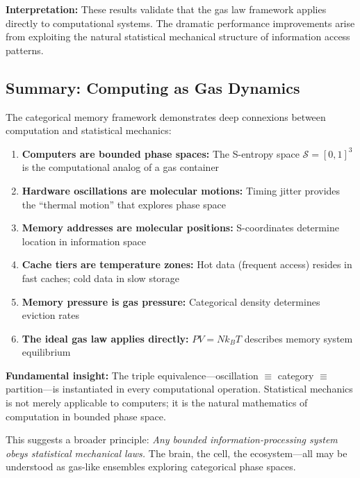 \textbf{Interpretation:} These results validate that the gas law framework applies directly to computational systems. The dramatic performance improvements arise from exploiting the natural statistical mechanical structure of information access patterns.

\subsection{Summary: Computing as Gas Dynamics}

The categorical memory framework demonstrates deep connexions between computation and statistical mechanics:

\begin{enumerate}
\item \textbf{Computers are bounded phase spaces:} The S-entropy space $\mathcal{S} = [0,1]^3$ is the computational analog of a gas container

\item \textbf{Hardware oscillations are molecular motions:} Timing jitter provides the ``thermal motion'' that explores phase space

\item \textbf{Memory addresses are molecular positions:} S-coordinates determine location in information space

\item \textbf{Cache tiers are temperature zones:} Hot data (frequent access) resides in fast caches; cold data in slow storage

\item \textbf{Memory pressure is gas pressure:} Categorical density determines eviction rates

\item \textbf{The ideal gas law applies directly:} $PV = Nk_BT$ describes memory system equilibrium
\end{enumerate}

\textbf{Fundamental insight:} The triple equivalence---oscillation $\equiv$ category $\equiv$ partition---is instantiated in every computational operation. Statistical mechanics is not merely applicable to computers; it is the natural mathematics of computation in bounded phase space.

This suggests a broader principle: \textit{Any bounded information-processing system obeys statistical mechanical laws.} The brain, the cell, the ecosystem---all may be understood as gas-like ensembles exploring categorical phase spaces.
